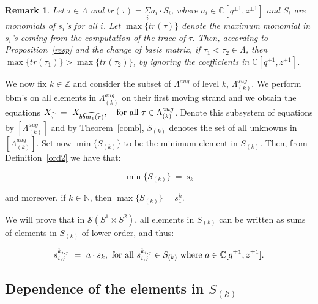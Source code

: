 \documentclass[11pt]{amsart}
\newtheorem{remark}{Remark}
\begin{document}
\begin{remark}\rm
Let $\tau\in \Lambda$ and $tr(\tau)=\underset{i}{\Sigma}a_i\cdot S_i$, where $a_i\in \mathbb{C}[q^{\pm 1}, z^{\pm 1}]$ and $S_i$ are monomials of $s_i$'s for all $i$. Let $\max\{tr(\tau)\}$ denote the maximum monomial in $s_i$'s coming from the computation of the trace of $\tau$. Then, according to Proposition~\ref{resp} and the change of basis matrix, if $\tau_1<\tau_2 \in \Lambda$, then $\max\{tr(\tau_1)\}>\max\{tr(\tau_2)\}$, by ignoring the coefficients in $\mathbb{C}[q^{\pm 1}, z^{\pm 1}]$.
\end{remark}

We now fix $k\in \mathbb{Z}$ and consider the subset of $\Lambda^{aug}$ of level $k$, $\Lambda_{(k)}^{aug}$. We perform bbm's on all elements in $\Lambda_{(k)}^{aug}$ on their first moving strand and we obtain the equations $X_{\widehat{\tau}}\ =\ X_{\widehat{bbm_1(\tau)}}, \quad {\rm for\ all}\ \tau\in \Lambda_{(k)}^{aug}$. Denote this subsystem of equations by $[\Lambda_{(k)}^{aug}]$ and by Theorem~\ref{comb}, $S_{(k)}$ denotes the set of all unknowns in $[\Lambda_{(k)}^{aug}]$. Set now $\min\{S_{(k)} \}$ to be the minimum element in $S_{(k)}$. Then, from Definition~\ref{ord2} we have that:

\begin{equation}
\min\{S_{(k)} \}\ =\  s_k
\end{equation}

\noindent and moreover, if $k\in \mathbb{N}$, then $\max\{S_{(k)} \}=s_1^k$.


\bigbreak

We will prove that in $\mathcal{S}(S^1 \times S^2)$, all elements in $S_{(k)}$ can be written as sums of elements in $S_{(k)}$ of lower order, and thus:

$$
s_{i, j}^{k_{i, j}} \ =\ a \cdot s_k,\ {\rm for\ all}\ s_{i, j}^{k_{i, j}} \in S_{(k)}\ {\rm where}\ a\in \mathbb{C}[q^{\pm 1}, z^{\pm 1}].
$$






\subsection{Dependence of the elements in $S_{(k)}$}
\end{document}
